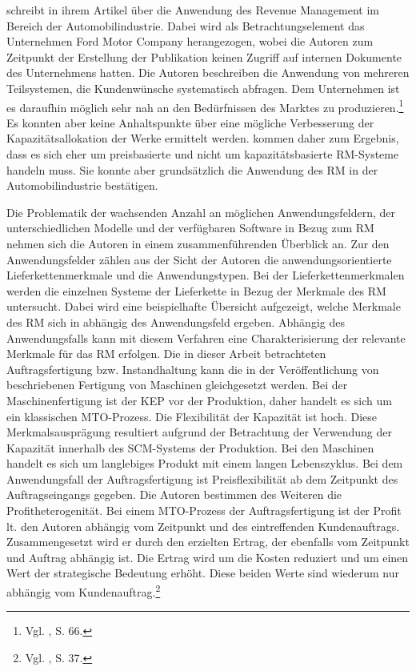 \cite{Specht:2008aa} schreibt in ihrem Artikel über die Anwendung des Revenue Management im Bereich der Automobilindustrie. Dabei wird als Betrachtungselement das Unternehmen \glqq Ford Motor {Company\grqq} herangezogen, wobei die Autoren zum Zeitpunkt der Erstellung der Publikation keinen Zugriff auf internen Dokumente des Unternehmens hatten. Die Autoren beschreiben die Anwendung von mehreren Teilsystemen, die Kundenwünsche systematisch abfragen. Dem Unternehmen ist es daraufhin möglich sehr nah an den Bedürfnissen des Marktes zu produzieren.\footnote{Vgl. \cite{Specht:2008aa}, S. 66.} Es konnten aber keine Anhaltspunkte über eine mögliche Verbesserung der Kapazitätsallokation der Werke ermittelt werden. \cite{Specht:2008aa} kommen daher zum Ergebnis, dass es sich eher um preisbasierte und nicht um kapazitätsbasierte RM-Systeme handeln muss. Sie konnte aber grundsätzlich die Anwendung des RM in der Automobilindustrie bestätigen.

Die Problematik der wachsenden Anzahl an möglichen Anwendungsfeldern, der unterschiedlichen Modelle und der verfügbaren Software in Bezug zum RM nehmen sich die Autoren \cite{quante2009revenue} in einem zusammenführenden Überblick an. Zur den Anwendungsfelder zählen aus der Sicht der Autoren die anwendungsorientierte Lieferkettenmerkmale und die Anwendungstypen. Bei der Lieferkettenmerkmalen werden die einzelnen Systeme der Lieferkette in Bezug der Merkmale des RM untersucht. Dabei wird eine beispielhafte Übersicht aufgezeigt, welche Merkmale des RM sich in abhängig des Anwendungsfeld ergeben. Abhängig des Anwendungsfalls kann mit diesem Verfahren eine Charakterisierung der relevante Merkmale für das RM erfolgen. Die in dieser Arbeit betrachteten Auftragsfertigung bzw. Instandhaltung kann die in der Veröffentlichung von \cite{quante2009revenue} beschriebenen Fertigung von Maschinen gleichgesetzt werden. Bei der Maschinenfertigung ist der KEP vor der Produktion, daher handelt es sich um ein klassischen MTO-Prozess. Die Flexibilität der Kapazität ist hoch. Diese Merkmalsausprägung resultiert aufgrund der Betrachtung der Verwendung der Kapazität innerhalb des SCM-Systems der Produktion. Bei den Maschinen handelt es sich um langlebiges Produkt mit einem langen Lebenszyklus. Bei dem Anwendungsfall der Auftragsfertigung ist Preisflexibilität ab dem Zeitpunkt des Auftragseingangs gegeben. Die Autoren bestimmen des Weiteren die Profitheterogenität. Bei einem MTO-Prozess der Auftragsfertigung ist der Profit lt. den Autoren abhängig vom Zeitpunkt und des eintreffenden Kundenauftrags. Zusammengesetzt wird er durch den erzielten Ertrag, der ebenfalls vom Zeitpunkt und Auftrag abhängig ist. Die Ertrag wird um die Kosten reduziert und um einen Wert der strategische Bedeutung erhöht. Diese beiden Werte sind wiederum nur abhängig vom Kundenauftrag.\footnote{Vgl. \cite{quante2009revenue}, S. 37.}

